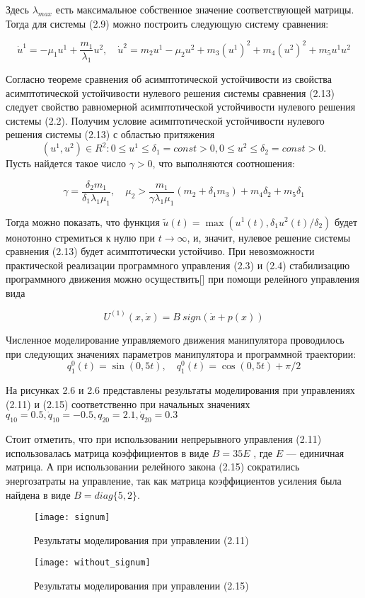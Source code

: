 Здесь $\lambda_{max}$ есть максимальное собственное значение соответствующей матрицы. 
Тогда для системы (2.9) можно построить следующую систему сравнения:

\begin{equation}\label{2.4'}
\dot u^1 = - \mu_1 u^1 + \frac{m_1}{\lambda_1} u^2, \quad \dot u^2 = m_2 u^1 - \mu_2 u^2 + m_3 (u^1)^2 + m_4(u^2)^2 + m_5 u^1 u^2
\end{equation}

Согласно теореме сравнения об асимптотической устойчивости \cite{matrosov01} из свойства асимптотической устойчивости нулевого решения системы сравнения (2.13) следует свойство равномерной асимптотической устойчивости нулевого решения системы (2.2). Получим условие асимптотической устойчивости нулевого решения системы (2.13) с областью притяжения $$ {(u^1, u^2) \in R^2 : 0 \le u^1 \le \delta_1 = const>0, 0 \le u^2 \le \delta_2 = const>0}. $$ Пусть найдется такое число $\gamma>0$, что выполняются соотношения:

\begin{equation}\label{2.10'}
\gamma = \frac{\delta_2 m_1}{\delta_1 \lambda_1 \mu_1}, \quad \mu_2 > \frac{m_1}{\gamma \lambda_1 \mu_1} (m_2 + \delta_1 m_3) + m_4 \delta_2 + m_5 \delta_1
\end{equation}

Тогда можно показать, что функция $\widetilde{u}(t) = \max{(u^1(t), \delta_1 u^2(t)/ \delta_2)}$ будет монотонно стремиться к нулю при $t \to \infty$, и, значит, нулевое решение системы сравнения (2.13) будет асимптотически устойчиво.
При невозможности практической реализации программного управления (2.3) и (2.4) стабилизацию программного движения можно осуществить[] при помощи релейного управления вида

\begin{equation} \label{2.11'}
U^{(1)}(x, \dot x) = B \ sign(\dot x + p(x))
\end{equation}

Численное моделирование управляемого движения манипулятора проводилось при следующих значениях параметров манипулятора и программной траектории:
$$q_1^0(t) = \sin(0,5t), \quad q_1^0(t) = \cos(0,5t) + \pi/2$$

На рисунках 2.6 и 2.6 представлены результаты моделирования при управлениях (2.11) и (2.15) соответственно при начальных значениях $q_{10} = 0.5, \dot q_10 = -0.5, q_{20} = 2.1, \dot q_{20} = 0.3$ 

Стоит отметить, что при использовании непрерывного управления (2.11) использовалась матрица коэффициентов в виде $B=35E$ , где $E$  --- единичная матрица. А при использовании релейного закона (2.15) сократились энергозатраты на управление, так как матрица коэффициентов усиления была найдена в виде $B = diag \lbrace 5, 2 \rbrace.$ 

\begin{figure}[H]
 	\centering
 	\texttt{[image: signum]}
 	\caption{Результаты моделирования при управлении (2.11)}
\end{figure}

\begin{figure}[H]
	\centering
	\texttt{[image: without\_signum]}
	\caption{Результаты моделирования при управлении (2.15)}
\end{figure}
